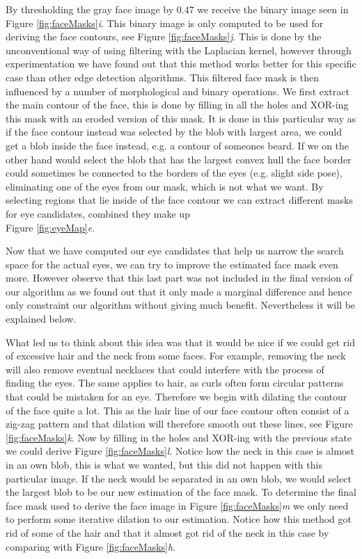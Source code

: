 

By thresholding the gray face image by $0.47$ we receive the binary image seen in Figure \ref{fig:faceMasks}\textit{i}. This binary image is only computed to be used for deriving the face contours, see Figure \ref{fig:faceMasks}\textit{j}. This is done by the unconventional way of using filtering with the Laplacian kernel, however through experimentation we have found out that this method works better for this specific case than other edge detection algorithms. This filtered face mask is then influenced by a number of morphological and binary operations. We first extract the main contour of the face, this is done by filling in all the holes and XOR-ing this mask with an eroded version of this mask. It is done in this particular way as if the face contour instead was selected by the blob with largest area, we could get a blob inside the face instead, e.g. a contour of someones beard. If we on the other hand would select the blob that has the largest convex hull the face border could sometimes be connected to the borders of the eyes (e.g. slight side pose), eliminating one of the eyes from our mask, which is not what we want. By selecting regions that lie inside of the face contour we can extract different masks for eye candidates, combined they make up \\ Figure \ref{fig:eyeMap}\textit{e}.

Now that we have computed our eye candidates that help us narrow the search space for the actual eyes, we can try to improve the estimated face mask even more. However observe that this last part was not included in the final version of our algorithm as we found out that it only made a marginal difference and hence only constraint our algorithm without giving much benefit. Nevertheless it will be explained below. 

What led us to think about this idea was that it would be nice if we could get rid of excessive hair and the neck from some faces. For example, removing the neck will also remove eventual necklaces that could interfere with the process of finding the eyes. The same applies to hair, as curls often form circular patterns that could be mistaken for an eye. Therefore we begin with dilating the contour of the face quite a lot. This as the hair line of our face contour often consist of a zig-zag pattern and that dilation will therefore smooth out these lines, see Figure \ref{fig:faceMasks}\textit{k}. Now by filling in the holes and XOR-ing with the previous state we could derive Figure \ref{fig:faceMasks}\textit{l}. Notice how the neck in this case is almost in an own blob, this is what we wanted, but this did not happen with this particular image. If the neck would be separated in an own blob, we would select the largest blob to be our new estimation of the face mask. To determine the final face mask used to derive the face image in Figure \ref{fig:faceMasks}\textit{m} we only need to perform some iterative dilation to our estimation. Notice how this method got rid of some of the hair and that it almost got rid of the neck in this case by comparing with Figure \ref{fig:faceMasks}\textit{h}.





